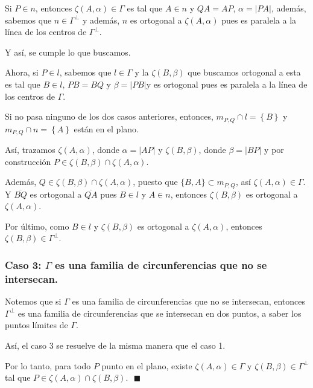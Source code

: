 \documentclass[12pt]{beamer}
\theoremstyle{definition}
\begin{document}
\begin{frame}
Si $P \in \textit{n}$, entonces $\zeta(A, \alpha) \in \Gamma$ es tal que $A \in \textit{n}$ y $QA = AP$, $\alpha = |PA|$, además, sabemos que $\textit{n} \in \Gamma^\bot$ y además,  $\textit{n}$ es ortogonal a $\zeta(A, \alpha)$ pues es paralela a la línea de los centros de $\Gamma^\bot$.

Y así, se cumple lo que buscamos.

\vspace{0.5cm}

Ahora, si $P \in \textit{l}$, sabemos que $\textit{l} \in \Gamma$ y la $\zeta(B, \beta)$ que buscamos ortogonal a esta es tal que $B \in \textit{l}, \, PB = BQ$ y $\beta = |PB|$y es ortogonal pues es paralela a la línea de los centros de $\Gamma$.
\end{frame}


\begin{frame}
Si no pasa ninguno de los dos casos anteriores, entonces, $m_{P, Q} \cap \textit{l} = \left\lbrace B \right\rbrace$ y $m_{P, Q} \cap \textit{n} = \left\lbrace A \right\rbrace$ están en el plano. 

\vspace{0.3cm}

Así, trazamos $\zeta(A, \alpha)$, donde $\alpha = |AP|$ y $\zeta(B, \beta)$, donde $\beta = |BP|$ y por construcción $P \in \zeta(B, \beta) \cap \zeta(A, \alpha)$. 

\vspace{0.3cm}

Además, $Q \in \zeta(B,\beta) \cap \zeta(A, \alpha)$, puesto que $\{ B, A\} \subset m_{P,Q}$, así $\zeta(A, \alpha) \in \Gamma$. Y $\overline{BQ}$ es ortogonal a $\overline{QA}$ pues $B \in l$ y $A \in n$, entonces $\zeta(B,\beta)$ es ortogonal a $\zeta(A, \alpha)$. 

\vspace{0.3cm}

Por último, como $B \in l$ y $\zeta(B,\beta)$ es ortogonal a $\zeta(A, \alpha)$, entonces $\zeta(B, \beta) \in \Gamma^\bot$.
\end{frame}

\begin{frame}
\frametitle{Caso 3: $\Gamma$ es una familia de circunferencias que no se intersecan.}
Notemos que si $\Gamma$ es una familia de circunferencias que no se intersecan, entonces $\Gamma^\bot$ es una familia de circunferencias que se intersecan en dos puntos, a saber los puntos límites de $\Gamma$. 

\vspace{0.3cm}

Así, el caso 3 se resuelve de la misma manera que el caso 1.

\vspace{0.5cm}

Por lo tanto, para todo $P$ punto en el plano, existe $\zeta(A, \alpha) \in \Gamma$ y $\zeta(B,\beta) \in \Gamma^\bot$ tal que $P \in \zeta(A, \alpha) \cap \zeta(B,\beta)$. $\, \, \blacksquare$
\end{frame}
\end{document}
